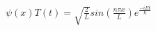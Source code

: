 \documentclass[preview]{standalone}
\begin{document}
\begin{center}
$\psi(x)T(t) = \sqrt{\frac{2}{L}}sin(\frac{n\pi x}{L})e^{\frac{-iEt}{\hbar}} $
\end{center}
\end{document}
